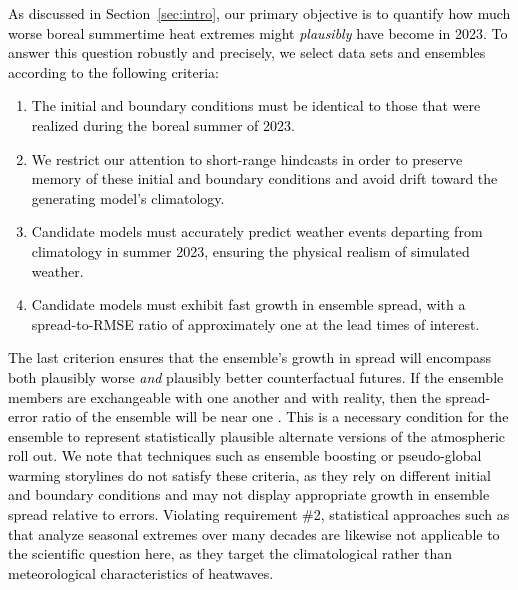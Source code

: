 \documentclass[draft]{agujournal2019}
\newcommand{\newTxt}{\textcolor{black}}
\begin{document}
\newTxt{
As discussed in Section~\ref{sec:intro}, our primary objective is to quantify how much worse boreal summertime heat extremes might \textit{plausibly} have become in 2023. To answer this question robustly and precisely, we select data sets and ensembles according to the following criteria:
\begin{enumerate}
\item The initial and boundary conditions must be identical to those that were realized during the boreal summer of 2023.
\item We restrict our attention to short-range hindcasts in order to preserve memory of these initial and boundary conditions and avoid drift toward the generating model's climatology.
\item Candidate models must accurately predict weather events departing from climatology in summer 2023, ensuring the physical realism of simulated weather.
\item Candidate models must exhibit fast growth in ensemble spread, with a spread-to-RMSE ratio of approximately one at the lead times of interest.
\end{enumerate}
The last criterion ensures that the ensemble's growth in spread will encompass both plausibly worse \textit{and} plausibly better counterfactual futures. If the ensemble members are exchangeable with one another and with reality, then the spread-error ratio of the ensemble will be near one \citep{Fortin2014}. This is a necessary condition for the ensemble to represent statistically plausible alternate versions of the atmospheric roll out.
We note that techniques such as ensemble boosting \citep{Fischer_2023} or pseudo-global warming storylines \citep{Shepherd2018} do not satisfy these criteria, as they rely on different initial and boundary conditions and may not display appropriate growth in ensemble spread relative to errors. Violating requirement \#2, statistical approaches such as \cite{Risser2025data} that analyze seasonal extremes over many decades are likewise not applicable to the scientific question here, as they target the climatological rather than meteorological characteristics of heatwaves.
}
\end{document}
